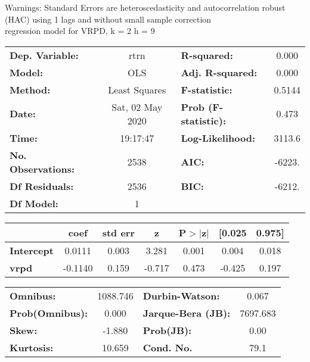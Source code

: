 Warnings: \newline
 [1] Standard Errors are heteroscedasticity and autocorrelation robust (HAC) using 1 lags and without small sample correction\\ 

regression model for VRPD, k = 2 h = 9\begin{center}
\begin{tabular}{lclc}
\toprule
\textbf{Dep. Variable:}    &       rtrn       & \textbf{  R-squared:         } &     0.000   \\
\textbf{Model:}            &       OLS        & \textbf{  Adj. R-squared:    } &     0.000   \\
\textbf{Method:}           &  Least Squares   & \textbf{  F-statistic:       } &    0.5144   \\
\textbf{Date:}             & Sat, 02 May 2020 & \textbf{  Prob (F-statistic):} &    0.473    \\
\textbf{Time:}             &     19:17:47     & \textbf{  Log-Likelihood:    } &    3113.6   \\
\textbf{No. Observations:} &        2538      & \textbf{  AIC:               } &    -6223.   \\
\textbf{Df Residuals:}     &        2536      & \textbf{  BIC:               } &    -6212.   \\
\textbf{Df Model:}         &           1      & \textbf{                     } &             \\
\bottomrule
\end{tabular}
\begin{tabular}{lcccccc}
                   & \textbf{coef} & \textbf{std err} & \textbf{z} & \textbf{P$> |$z$|$} & \textbf{[0.025} & \textbf{0.975]}  \\
\midrule
\textbf{Intercept} &       0.0111  &        0.003     &     3.281  &         0.001        &        0.004    &        0.018     \\
\textbf{vrpd}      &      -0.1140  &        0.159     &    -0.717  &         0.473        &       -0.425    &        0.197     \\
\bottomrule
\end{tabular}
\begin{tabular}{lclc}
\textbf{Omnibus:}       & 1088.746 & \textbf{  Durbin-Watson:     } &    0.067  \\
\textbf{Prob(Omnibus):} &   0.000  & \textbf{  Jarque-Bera (JB):  } & 7697.683  \\
\textbf{Skew:}          &  -1.880  & \textbf{  Prob(JB):          } &     0.00  \\
\textbf{Kurtosis:}      &  10.659  & \textbf{  Cond. No.          } &     79.1  \\
\bottomrule
\end{tabular}
\end{center}

